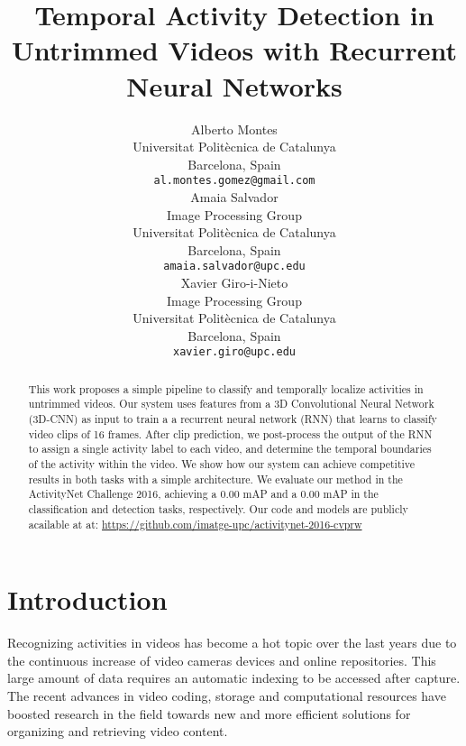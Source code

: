 \documentclass{article}
\title{Temporal Activity Detection in Untrimmed Videos with Recurrent Neural Networks}
\author{
    Alberto Montes \\
    Universitat Politècnica de Catalunya \\
    Barcelona, Spain \\
    \texttt{al.montes.gomez@gmail.com} \\
    \And
    Amaia Salvador \\
    Image Processing Group \\
    Universitat Politècnica de Catalunya \\
    Barcelona, Spain \\
    \texttt{amaia.salvador@upc.edu} \\
    \And
    Xavier Giro-i-Nieto \\
    Image Processing Group \\
    Universitat Politècnica de Catalunya \\
    Barcelona, Spain \\
    \texttt{xavier.giro@upc.edu} \\
}
\begin{document}

\maketitle

\begin{abstract}


    
    This work proposes a simple pipeline to classify and temporally localize activities in untrimmed videos. Our system uses features from a 3D Convolutional Neural Network (3D-CNN) as input to train a a recurrent neural network (RNN) that learns to classify video clips of 16 frames. After clip prediction, we post-process the output of the RNN to assign a single activity label to each video, and determine the temporal boundaries of the activity within the video. We show how our system can achieve competitive results in both tasks with a simple architecture. We evaluate our method in the ActivityNet Challenge 2016, achieving a 0.00 mAP and a 0.00 mAP in the classification and detection tasks, respectively. Our code and models are publicly acailable at at: \url{ https://github.com/imatge-upc/activitynet-2016-cvprw}

\end{abstract}

\section{Introduction}

Recognizing activities in videos has become a hot topic over the last years due to the continuous increase of video cameras devices and online repositories.
This large amount of data requires an automatic indexing to be accessed after capture.
The recent advances in video coding, storage and computational resources have boosted research in the field towards new and more efficient solutions for organizing and retrieving video content.
\end{document}
